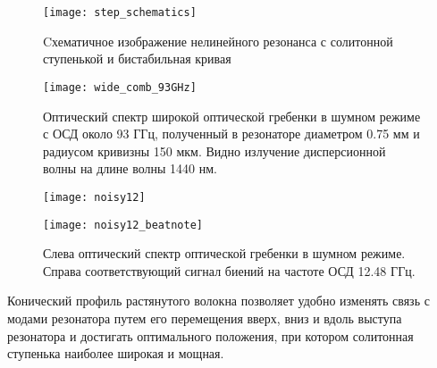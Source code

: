 \begin{figure}[ht]
\centering
  \texttt{[image: step\_schematics]}
  \caption{Cхематичное изображение нелинейного резонанса с солитонной ступенькой и бистабильная кривая}
  \label{step_schematics}
\end{figure}

\begin{figure}[ht]
\centering
  \texttt{[image: wide\_comb\_93GHz]}
  \caption{Оптический спектр широкой оптической гребенки в шумном режиме с ОСД около 93 ГГц, полученный в резонаторе диаметром 0.75 мм и радиусом кривизны 150 мкм. Видно излучение дисперсионной волны на длине волны 1440 нм.}
  \label{wide_comb_93GHz}
\end{figure}

\begin{figure}[ht]
  \begin{minipage}[ht]{0.49\linewidth}\centering
    \texttt{[image: noisy12]}
  \end{minipage}
  \hfill
  \begin{minipage}[ht]{0.49\linewidth}\centering
    \texttt{[image: noisy12\_beatnote]}
  \end{minipage}
  \caption{Слева оптический спектр оптической гребенки в шумном режиме. Справа соответствующий сигнал биений на частоте ОСД 12.48 ГГц.}
  \label{noisy12}
\end{figure}

Конический профиль растянутого волокна позволяет удобно изменять связь с модами резонатора путем его перемещения вверх, вниз и вдоль выступа резонатора и достигать оптимального положения, при котором солитонная ступенька наиболее широкая и мощная.

